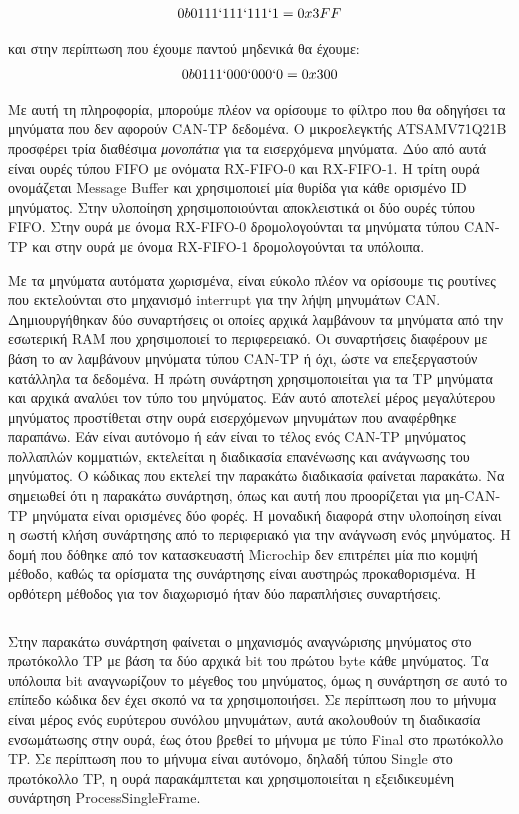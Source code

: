 \documentclass[a4paper,nobib,justified]{tufte-book}
\begin{document}
\begin{equation}
0b0111`111`111`1 = 0x3FF
\end{equation}

και στην περίπτωση που έχουμε παντού μηδενικά θα έχουμε:
\begin{equation}
0b0111`000`000`0 = 0x300
\end{equation}

Με αυτή τη πληροφορία, μπορούμε πλέον να ορίσουμε το φίλτρο που θα οδηγήσει τα μηνύματα που δεν αφορούν CAN-TP δεδομένα. Ο μικροελεγκτής ATSAMV71Q21B προσφέρει τρία διαθέσιμα \textit{μονοπάτια} για τα εισερχόμενα μηνύματα. Δύο από αυτά είναι ουρές τύπου FIFO με ονόματα RX-FIFO-0 και RX-FIFO-1. Η τρίτη ουρά ονομάζεται Message Buffer και χρησιμοποιεί μία θυρίδα για κάθε ορισμένο ID μηνύματος. Στην υλοποίηση χρησιμοποιούνται αποκλειστικά οι δύο ουρές τύπου FIFO. Στην ουρά με όνομα RX-FIFO-0 δρομολογούνται τα μηνύματα τύπου CAN-TP και στην ουρά με όνομα RX-FIFO-1 δρομολογούνται τα υπόλοιπα.

Με τα μηνύματα αυτόματα χωρισμένα, είναι εύκολο πλέον να ορίσουμε τις ρουτίνες που εκτελούνται στο μηχανισμό interrupt για την λήψη μηνυμάτων CAN. Δημιουργήθηκαν δύο συναρτήσεις οι οποίες αρχικά λαμβάνουν τα μηνύματα από την εσωτερική RAM που χρησιμοποιεί το περιφερειακό. Οι συναρτήσεις διαφέρουν με βάση το αν λαμβάνουν μηνύματα τύπου CAN-TP ή όχι, ώστε να επεξεργαστούν κατάλληλα τα δεδομένα. Η πρώτη συνάρτηση χρησιμοποιείται για τα TP μηνύματα και αρχικά αναλύει τον τύπο του μηνύματος. Εάν αυτό αποτελεί μέρος μεγαλύτερου μηνύματος προστίθεται στην ουρά εισερχόμενων μηνυμάτων που αναφέρθηκε παραπάνω. Εάν είναι αυτόνομο ή εάν είναι το τέλος ενός CAN-TP μηνύματος πολλαπλών κομματιών, εκτελείται η διαδικασία επανένωσης και ανάγνωσης του μηνύματος. Ο κώδικας που εκτελεί την παρακάτω διαδικασία φαίνεται παρακάτω. Να σημειωθεί ότι η παρακάτω συνάρτηση, όπως και αυτή που προορίζεται για μη-CAN-TP μηνύματα είναι ορισμένες δύο φορές. Η μοναδική διαφορά στην υλοποίηση είναι η σωστή κλήση συνάρτησης από το περιφεριακό για την ανάγνωση ενός μηνύματος. Η δομή που δόθηκε από τον κατασκευαστή Microchip δεν επιτρέπει μία πιο κομψή μέθοδο, καθώς τα ορίσματα της συνάρτησης είναι αυστηρώς προκαθορισμένα. Η ορθότερη μέθοδος για τον διαχωρισμό ήταν δύο παραπλήσιες συναρτήσεις.
\inputminted{c++}{code/examples/driver-tp-message-receiver.cpp}

Στην παρακάτω συνάρτηση φαίνεται ο μηχανισμός αναγνώρισης μηνύματος στο πρωτόκολλο TP με βάση τα δύο αρχικά bit του πρώτου byte κάθε μηνύματος. Τα υπόλοιπα bit αναγνωρίζουν το μέγεθος του μηνύματος, όμως η συνάρτηση σε αυτό το επίπεδο κώδικα δεν έχει σκοπό να τα χρησιμοποιήσει. Σε περίπτωση που το μήνυμα είναι μέρος ενός ευρύτερου συνόλου μηνυμάτων, αυτά ακολουθούν τη διαδικασία ενσωμάτωσης στην ουρά, έως ότου βρεθεί το μήνυμα με τύπο Final στο πρωτόκολλο TP. Σε περίπτωση που το μήνυμα είναι αυτόνομο, δηλαδή τύπου Single στο πρωτόκολλο TP, η ουρά παρακάμπτεται και χρησιμοποιείται η εξειδικευμένη συνάρτηση ProcessSingleFrame\(\).
\end{document}
